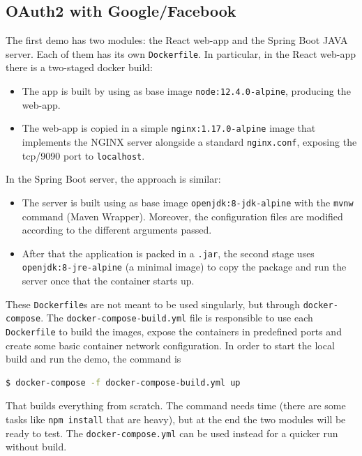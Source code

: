\subsection{OAuth2 with Google/Facebook}
The first demo has two modules: the React web-app and the Spring Boot JAVA server. Each of them has its own \texttt{Dockerfile}. In particular, in the React web-app there is a two-staged docker build:

\begin{itemize}
    \item The app is built by using as base image \texttt{node:12.4.0-alpine}, producing the web-app.
    \item The web-app is copied in a simple \texttt{nginx:1.17.0-alpine} image that implements the NGINX server alongside a standard \texttt{nginx.conf}, exposing the tcp/9090 port to \texttt{localhost}.
\end{itemize}

\noindent In the Spring Boot server, the approach is similar:

\begin{itemize}
    \item The server is built using as base image \texttt{openjdk:8-jdk-alpine} with the \texttt{mvnw} command (Maven Wrapper). Moreover, the configuration files are modified according to the different arguments passed.
    \item After that the application is packed in a \texttt{.jar}, the second stage uses \texttt{openjdk:8-jre-alpine} (a minimal image) to copy the package and run the server once that the container starts up.
\end{itemize}

These \texttt{Dockerfile}s are not meant to be used singularly, but through \texttt{docker-compose}. The \texttt{docker-compose-build.yml} file is responsible to use each \texttt{Dockerfile} to build the images, expose the containers in predefined ports and create some basic container network configuration. In order to start the local build and run the demo, the command is

\begin{lstlisting}[language=bash, basicstyle=\fontsize{12}{14}\ttfamily]
  $ docker-compose -f docker-compose-build.yml up
\end{lstlisting}

\noindent That builds everything from scratch. The command needs time (there are some tasks like \texttt{npm install} that are heavy), but at the end the two modules will be ready to test. The \texttt{docker-compose.yml} can be used instead for a 
quicker run without build.

